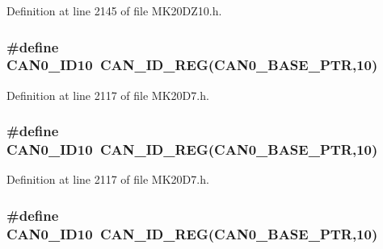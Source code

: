 Definition at line 2145 of file M\+K20\+D\+Z10.\+h.

\subsubsection[{\texorpdfstring{C\+A\+N0\+\_\+\+I\+D10}{CAN0_ID10}}]{\setlength{\rightskip}{0pt plus 5cm}\#define C\+A\+N0\+\_\+\+I\+D10~{\bf C\+A\+N\+\_\+\+I\+D\+\_\+\+R\+EG}({\bf C\+A\+N0\+\_\+\+B\+A\+S\+E\+\_\+\+P\+TR},10)}\hypertarget{group___c_a_n___register___accessor___macros_ga7564239e3d5659e24ef02cc0baab07eb}{}\label{group___c_a_n___register___accessor___macros_ga7564239e3d5659e24ef02cc0baab07eb}


Definition at line 2117 of file M\+K20\+D7.\+h.

\subsubsection[{\texorpdfstring{C\+A\+N0\+\_\+\+I\+D10}{CAN0_ID10}}]{\setlength{\rightskip}{0pt plus 5cm}\#define C\+A\+N0\+\_\+\+I\+D10~{\bf C\+A\+N\+\_\+\+I\+D\+\_\+\+R\+EG}({\bf C\+A\+N0\+\_\+\+B\+A\+S\+E\+\_\+\+P\+TR},10)}\hypertarget{group___c_a_n___register___accessor___macros_ga7564239e3d5659e24ef02cc0baab07eb}{}\label{group___c_a_n___register___accessor___macros_ga7564239e3d5659e24ef02cc0baab07eb}


Definition at line 2117 of file M\+K20\+D7.\+h.

\subsubsection[{\texorpdfstring{C\+A\+N0\+\_\+\+I\+D10}{CAN0_ID10}}]{\setlength{\rightskip}{0pt plus 5cm}\#define C\+A\+N0\+\_\+\+I\+D10~{\bf C\+A\+N\+\_\+\+I\+D\+\_\+\+R\+EG}({\bf C\+A\+N0\+\_\+\+B\+A\+S\+E\+\_\+\+P\+TR},10)}\hypertarget{group___c_a_n___register___accessor___macros_ga7564239e3d5659e24ef02cc0baab07eb}{}\label{group___c_a_n___register___accessor___macros_ga7564239e3d5659e24ef02cc0baab07eb}


